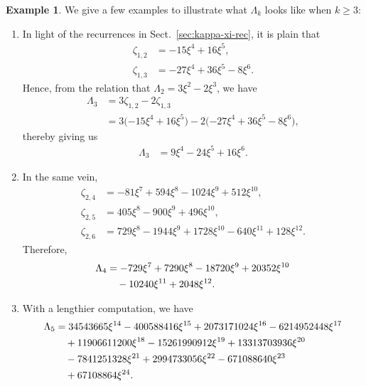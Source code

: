 \documentclass[12pt,reqno]{amsart}
\numberwithin{equation}{section}
\theoremstyle{theorem}
\theoremstyle{definition}
\newtheorem{example}{Example}
\begin{document}
\begin{example}
    We give a few examples to illustrate what $\Lambda_k$ looks like when $k\ge 3$:
    \begin{enumerate}[label=\textbf{(\arabic*).~},leftmargin=*,labelsep=0cm,align=left,itemsep=6pt]
        \item In light of the recurrences in Sect.~\ref{sec:kappa-xi-rec}, it is plain that
        \begin{align*}
            \zeta_{1,2} &= -15 \xi^4 + 16 \xi^5,\\
            \zeta_{1,3} &= -27 \xi^4 + 36 \xi^5 - 8 \xi^6.
        \end{align*}
        Hence, from the relation that $\Lambda_2 = 3\xi^2-2\xi^3$, we have
        \begin{align*}
            \Lambda_3 &= 3\zeta_{1,2} - 2\zeta_{1,3}\\
            &= 3\big({-15} \xi^4 + 16 \xi^5\big) -2 \big({-27} \xi^4 + 36 \xi^5 - 8 \xi^6\big),
        \end{align*}
        thereby giving us
        \begin{align}\label{eq:L1-xi}
            \Lambda_3 &= 9 \xi^4 - 24 \xi^5 + 16 \xi^6.
        \end{align}
	
        \item In the same vein,
        \begin{align*}
            \zeta_{2,4} &= -81 \xi^7 + 594 \xi^8 - 1024 \xi^9 + 512 \xi^{10},\\
            \zeta_{2,5} &= 405 \xi^8 - 900 \xi^9 + 496 \xi^{10},\\
            \zeta_{2,6} &= 729 \xi^8 - 1944 \xi^9 + 1728 \xi^{10} - 640 \xi^{11} + 128 \xi^{12}.
    	\end{align*}
    	Therefore,
    	\begin{align} \label{eq:L2-xi}
    		\Lambda_4 &= -729 \xi^7 + 7290 \xi^8 - 18720 \xi^9 + 20352 \xi^{10}\notag\\
            &\quad - 10240 \xi^{11} + 2048 \xi^{12}.
        \end{align}
	
        \item With a lengthier computation, we have
        \begin{align}\label{eq:L3-xi}
            \Lambda_5 &= 34543665 \xi^{14}-400588416 \xi^{15}+2073171024 \xi^{16}-6214952448 \xi^{17}\notag\\
            &\quad +11906611200 \xi^{18}-15261990912 \xi^{19}+13313703936 \xi^{20}\notag\\
            &\quad -7841251328 \xi^{21}+2994733056 \xi^{22}-671088640 \xi^{23}\notag\\
            &\quad +67108864 \xi^{24}.
    	\end{align}
    \end{enumerate}
\end{example}
\end{document}
